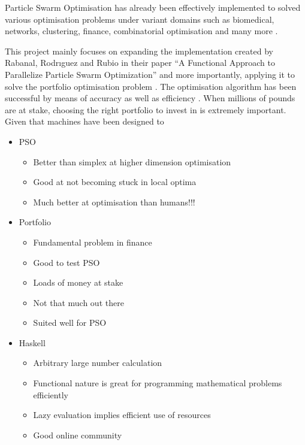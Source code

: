 \documentclass{pdfmx4020}
\begin{document}
  Particle Swarm Optimisation has already been effectively implemented to solved various optimisation problems \cite{pso_app,pso_app2,pso_app3} under variant domains such as biomedical, networks, clustering, finance, combinatorial optimisation and many more \cite{pso_app_main}. 

  This project mainly focuses on expanding the implementation created by Rabanal, Rodrıguez and Rubio in their paper ``A Functional Approach to Parallelize Particle Swarm Optimization'' and more importantly, applying it to solve the portfolio optimisation problem \cite{marko2}. The optimisation algorithm has been successful by means of accuracy as well as efficiency \cite{haskellPSO}. When millions of pounds are at stake, choosing the right portfolio to invest in is extremely important. Given that machines have been designed to  

  \begin{itemize}
    \item PSO
    \begin{itemize}
      \item Better than simplex at higher dimension optimisation
      \item Good at not becoming stuck in local optima
      \item Much better at optimisation than humans!!!
    \end{itemize}
    \item Portfolio
    \begin{itemize}
      \item Fundamental problem in finance
      \item Good to test PSO
      \item Loads of money at stake
      \item Not that much out there
      \item Suited well for PSO
    \end{itemize}
    \item Haskell
    \begin{itemize}
      \item Arbitrary large number calculation
      \item Functional nature is great for programming mathematical problems efficiently
      \item Lazy evaluation implies efficient use of resources
      \item Good online community
    \end{itemize}
  \end{itemize}
\end{document}
